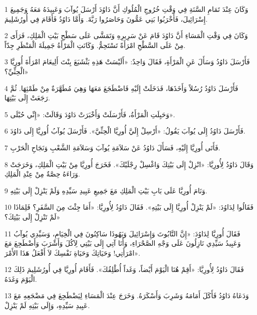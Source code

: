 \par 1 وَكَانَ عِنْدَ تَمَامِ السَّنَةِ فِي وَقْتِ خُرُوجِ الْمُلُوكِ أَنَّ دَاوُدَ أَرْسَلَ يُوآبَ وَعَبِيدَهُ مَعَهُ وَجَمِيعَ إِسْرَائِيلَ، فَأَخْرَبُوا بَنِي عَمُّونَ وَحَاصَرُوا رَبَّةَ. وَأَمَّا دَاوُدُ فَأَقَامَ فِي أُورُشَلِيمَ.
\par 2 وَكَانَ فِي وَقْتِ الْمَسَاءِ أَنَّ دَاوُدَ قَامَ عَنْ سَرِيرِهِ وَتَمَشَّى عَلَى سَطْحِ بَيْتِ الْمَلِكِ، فَرَأَى مِنْ عَلَى السَّطْحِ امْرَأَةً تَسْتَحِمُّ. وَكَانَتِ الْمَرْأَةُ جَمِيلَةَ الْمَنْظَرِ جِدّاً.
\par 3 فَأَرْسَلَ دَاوُدُ وَسَأَلَ عَنِ الْمَرْأَةِ، فَقَالَ وَاحِدٌ: «أَلَيْسَتْ هَذِهِ بَثْشَبَعَ بِنْتَ أَلِيعَامَ امْرَأَةَ أُورِيَّا الْحِثِّيِّ؟»
\par 4 فَأَرْسَلَ دَاوُدُ رُسُلاً وَأَخَذَهَا، فَدَخَلَتْ إِلَيْهِ فَاضْطَجَعَ مَعَهَا وَهِيَ مُطَهَّرَةٌ مِنْ طَمْثِهَا. ثُمَّ رَجَعَتْ إِلَى بَيْتِهَا.
\par 5 وَحَبِلَتِ الْمَرْأَةُ، فَأَرْسَلَتْ وَأَخْبَرَتْ دَاوُدَ وَقَالَتْ: «إِنِّي حُبْلَى».
\par 6 فَأَرْسَلَ دَاوُدُ إِلَى يُوآبَ يَقُولُ: «أَرْسِلْ إِلَيَّ أُورِيَّا الْحِثِّيَّ». فَأَرْسَلَ يُوآبُ أُورِيَّا إِلَى دَاوُدَ.
\par 7 فَأَتَى أُورِيَّا إِلَيْهِ، فَسَأَلَ دَاوُدُ عَنْ سَلاَمَةِ يُوآبَ وَسَلاَمَةِ الشَّعْبِ وَنَجَاحِ الْحَرْبِ.
\par 8 وَقَالَ دَاوُدُ لِأُورِيَّا: «انْزِلْ إِلَى بَيْتِكَ وَاغْسِلْ رِجْلَيْكَ». فَخَرَجَ أُورِيَّا مِنْ بَيْتِ الْمَلِكِ، وَخَرَجَتْ وَرَاءَهُ حِصَّةٌ مِنْ عِنْدِ الْمَلِكِ.
\par 9 وَنَامَ أُورِيَّا عَلَى بَابِ بَيْتِ الْمَلِكِ مَعَ جَمِيعِ عَبِيدِ سَيِّدِهِ وَلَمْ يَنْزِلْ إِلَى بَيْتِهِ.
\par 10 فَقَالُوا لِدَاوُدَ: «لَمْ يَنْزِلْ أُورِيَّا إِلَى بَيْتِهِ». فَقَالَ دَاوُدُ لِأُورِيَّا: «أَمَا جِئْتَ مِنَ السَّفَرِ؟ فَلِمَاذَا لَمْ تَنْزِلْ إِلَى بَيْتِكَ؟»
\par 11 فَقَالَ أُورِيَّا لِدَاوُدَ: «إِنَّ التَّابُوتَ وَإِسْرَائِيلَ وَيَهُوذَا سَاكِنُونَ فِي الْخِيَامِ، وَسَيِّدِي يُوآبُ وَعَبِيدُ سَيِّدِي نَازِلُونَ عَلَى وَجْهِ الصَّحْرَاءِ، وَأَنَا آتِي إِلَى بَيْتِي لِآكُلَ وَأَشْرَبَ وَأَضْطَجِعَ مَعَ امْرَأَتِي! وَحَيَاتِكَ وَحَيَاةِ نَفْسِكَ لاَ أَفْعَلُ هَذَا الأَمْرَ».
\par 12 فَقَالَ دَاوُدُ لِأُورِيَّا: «أَقِمْ هُنَا الْيَوْمَ أَيْضاً، وَغَداً أُطْلِقُكَ». فَأَقَامَ أُورِيَّا فِي أُورُشَلِيمَ ذَلِكَ الْيَوْمَ وَغَدَهُ.
\par 13 وَدَعَاهُ دَاوُدُ فَأَكَلَ أَمَامَهُ وَشَرِبَ وَأَسْكَرَهُ. وَخَرَجَ عِنْدَ الْمَسَاءِ لِيَضْطَجِعَ فِي مَضْجَعِهِ مَعَ عَبِيدِ سَيِّدِهِ، وَإِلَى بَيْتِهِ لَمْ يَنْزِلْ.
